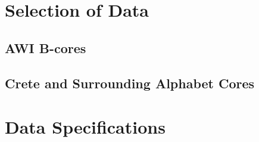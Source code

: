 \documentclass[../../CompleteThesis/Complete_1stDraft]{subfiles}
\begin{document}
\section[Selection][Selection]{Selection of Data}
\subsection[AWI B-cores]{AWI B-cores}
\subsection[Crete Area][Crete Area]{Crete and Surrounding Alphabet Cores}

\section[Data Specifications][Data Specifications]{Data Specifications}
\end{document}
